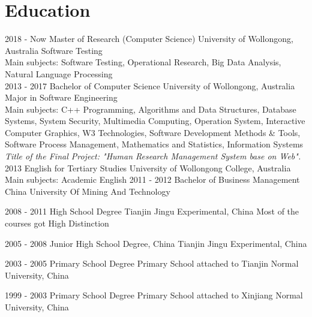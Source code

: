 \documentclass[]{friggeri-cv}
\begin{document}
\section{Education}
\begin{entrylist}
  \entry
    {2018 - Now}
    {Master of Research (Computer Science)}
    {University of Wollongong, Australia}
    {Software Testing\\
    Main subjects: Software Testing, Operational Research, Big Data Analysis, Natural Language Processing\\}
  \entry
    {2013 - 2017}
    {Bachelor of Computer Science​}
    {University of Wollongong, Australia}
    {Major in Software Engineering\\
    Main subjects: C++ Programming, Algorithms and Data Structures, Database Systems, System Security, Multimedia Computing, Operation System, Interactive Computer Graphics, W3 Technologies, Software Development Methods \& Tools, Software Process Management, Mathematics and Statistics, Information Systems\\
    \emph{Title of the Final Project: "Human Research Management System base on Web".}\\}
  \entry
    {2013}
    {English for Tertiary Studies}
    {University of Wollongong College, Australia}
    {Main subjects: Academic English}
  \entry
    {2011 - 2012}
    {Bachelor of Business Management}
    {China University Of Mining And Technology}
    
  \entry
    {2008 - 2011}
    {High School Degree}
    {Tianjin Jingu Experimental, China}
    {Most of the courses got High Distinction}
    
  \entry
    {2005 - 2008}
    {Junior High School Degree, China}
    {Tianjin Jingu Experimental, China}
    
  \entry
    {2003 - 2005}
    {Primary School Degree}
    {Primary School attached to Tianjin Normal University, China} 
    
  \entry
    {1999 - 2003}
    {Primary School Degree}
    {Primary School attached to Xinjiang Normal University, China}  
    
\end{entrylist}
\end{document}
